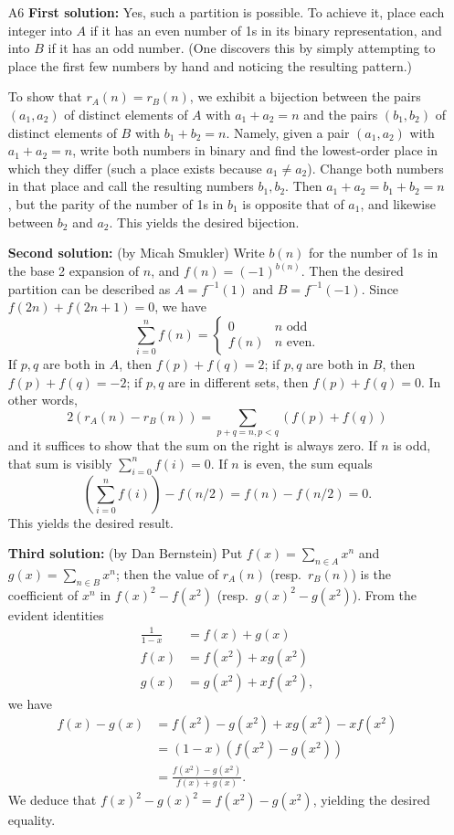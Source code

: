 \documentclass[amssymb,twocolumn,pra,10pt,aps]{revtex4-1}
\begin{document}
\begin{itemize}
\item[A6]
\textbf{First solution:} Yes, such a partition is possible. To achieve it,
place each integer into $A$ if it has an even number of 1s in its binary
representation, and into $B$ if it has an odd number. (One discovers this
by simply attempting to place the first few numbers by hand and noticing
the resulting pattern.)

To show that $r_A(n) = r_B(n)$, we exhibit a bijection between the pairs
$(a_1, a_2)$ of distinct elements of $A$ with $a_1 + a_2 = n$ and the
pairs $(b_1, b_2)$ of distinct elements of $B$ with $b_1 + b_2 = n$.
Namely, given a pair $(a_1, a_2)$ with $a_1+a_2 = n$, write both numbers
in binary and find the lowest-order place in which they differ (such a
place exists because $a_1 \neq a_2$). Change both numbers in that place
and call the resulting numbers $b_1, b_2$. Then $a_1 + a_2 = b_1 + b_2 =
n$, but the parity of the number of 1s in $b_1$ is opposite that of $a_1$,
and likewise between $b_2$ and $a_2$. This yields the desired bijection.

\textbf{Second solution:} (by Micah Smukler)
Write $b(n)$ for the number of 1s in the base 2 expansion of $n$,
and $f(n) = (-1)^{b(n)}$.
Then
the desired partition can be described as $A = f^{-1}(1)$ and $B = f^{-1}(-1)$.
Since $f(2n) + f(2n+1) = 0$, we have
\[
\sum_{i=0}^n f(n) = \begin{cases} 0 & \mbox{$n$ odd} \\
f(n) & \mbox{$n$ even.} \end{cases}
\]
If $p,q$ are both in $A$, then $f(p) + f(q) = 2$;
if $p,q$ are both in $B$, then $f(p) + f(q) = -2$; if $p,q$ are
in different sets, then $f(p) + f(q) = 0$. In other words,
\[
2(r_A(n) - r_B(n)) = \sum_{p+q=n,p < q} (f(p) + f(q))
\]
and it suffices to show that the sum on the right is always zero.
If $n$ is odd, that sum is visibly $\sum_{i=0}^n f(i) = 0$.
If $n$ is even, the sum equals
\[
\left(\sum_{i=0}^n f(i) \right) - f(n/2) = f(n) - f(n/2) = 0.
\]
This yields the desired result.

\textbf{Third solution:} (by Dan Bernstein)
Put $f(x) = \sum_{n \in A} x^n$ and $g(x) = \sum_{n \in B} x^n$; then
the value of $r_A(n)$ (resp.\ $r_B(n)$) is the coefficient of $x^n$
in $f(x)^2 - f(x^2)$ (resp.\ $g(x)^2 - g(x^2)$). From the evident identities
\begin{align*}
\frac{1}{1-x} &= f(x) + g(x) \\
f(x) &= f(x^2) + xg(x^2) \\
g(x) &= g(x^2) + xf(x^2),
\end{align*}
we have
\begin{align*}
f(x) - g(x) &= f(x^2) - g(x^2) + xg(x^2) - xf(x^2) \\
&= (1-x)(f(x^2) - g(x^2)) \\
&= \frac{f(x^2) - g(x^2)}{f(x) + g(x)}.
\end{align*}
We deduce that $f(x)^2 - g(x)^2 = f(x^2) - g(x^2)$, yielding the desired
equality.


\end{itemize}
\end{document}
